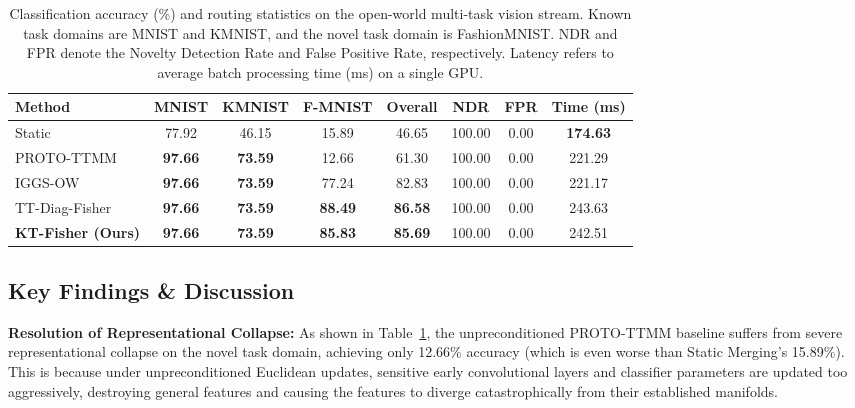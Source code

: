 \documentclass{article}
\theoremstyle{plain}
\theoremstyle{definition}
\theoremstyle{remark}
\begin{document}
\begin{table}[t]
\caption{Classification accuracy (\%) and routing statistics on the open-world multi-task vision stream. Known task domains are MNIST and KMNIST, and the novel task domain is FashionMNIST. NDR and FPR denote the Novelty Detection Rate and False Positive Rate, respectively. Latency refers to average batch processing time (ms) on a single GPU.}
\label{tab:main_results}
\vskip 0.15in
\begin{center}
\begin{small}
\begin{sc}
\setlength{\tabcolsep}{4pt}
\begin{tabular}{lccccccc}
\toprule
Method & MNIST & KMNIST & F-MNIST & Overall & NDR & FPR & Time (ms) \\
\midrule
Static & 77.92 & 46.15 & 15.89 & 46.65 & 100.00 & 0.00 & \textbf{174.63} \\
PROTO-TTMM & \textbf{97.66} & \textbf{73.59} & 12.66 & 61.30 & 100.00 & 0.00 & 221.29 \\
IGGS-OW & \textbf{97.66} & \textbf{73.59} & 77.24 & 82.83 & 100.00 & 0.00 & 221.17 \\
TT-Diag-Fisher & \textbf{97.66} & \textbf{73.59} & \textbf{88.49} & \textbf{86.58} & 100.00 & 0.00 & 243.63 \\
\textbf{KT-Fisher (Ours)} & \textbf{97.66} & \textbf{73.59} & \textbf{85.83} & \textbf{85.69} & 100.00 & 0.00 & 242.51 \\
\bottomrule
\end{tabular}
\end{sc}
\end{small}
\end{center}
\vskip -0.1in
\end{table}

\subsection{Key Findings \& Discussion}

\textbf{Resolution of Representational Collapse:}
As shown in Table~\ref{tab:main_results}, the unpreconditioned PROTO-TTMM baseline suffers from severe representational collapse on the novel task domain, achieving only 12.66\% accuracy (which is even worse than Static Merging's 15.89\%). This is because under unpreconditioned Euclidean updates, sensitive early convolutional layers and classifier parameters are updated too aggressively, destroying general features and causing the features to diverge catastrophically from their established manifolds.
\end{document}
